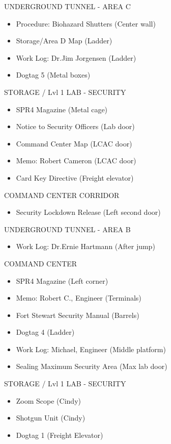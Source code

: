 \begin{subregion}{UNDERGROUND TUNNEL - AREA C}
    \begin{itemize}
        \item Procedure: Biohazard Shutters (Center wall)
        \item Storage/Area D Map (Ladder)
        \item Work Log: Dr.Jim Jorgensen (Ladder)
        \item Dogtag 5 (Metal boxes)
    \end{itemize}
\end{subregion}

\begin{subregion}{STORAGE / Lvl 1 LAB - SECURITY}
    \begin{itemize}
        \item SPR4 Magazine (Metal cage)
        \item Notice to Security Officers (Lab door)
        \item Command Center Map (LCAC door)
        \item Memo: Robert Cameron (LCAC door)
        \item Card Key Directive (Freight elevator)
    \end{itemize}
\end{subregion}


\begin{subregion}{COMMAND CENTER CORRIDOR}
    \begin{itemize}
        \item Security Lockdown Release (Left second door)
    \end{itemize}
\end{subregion}

\begin{subregion}{UNDERGROUND TUNNEL - AREA B}
    \begin{itemize}
        \item Work Log: Dr.Ernie Hartmann (After jump)
    \end{itemize}
\end{subregion}

\begin{subregion}{COMMAND CENTER}
    \begin{itemize}
        \item SPR4 Magazine (Left corner)
        \item Memo: Robert C., Engineer (Terminals)
        \item Fort Stewart Security Manual (Barrels)
        \item Dogtag 4 (Ladder)
        \item Work Log: Michael, Engineer (Middle platform)
        \item Sealing Maximum Security Area (Max lab door)
    \end{itemize}
\end{subregion}

\begin{subregion}{STORAGE / Lvl 1 LAB - SECURITY}
    \begin{itemize}
        \item Zoom Scope (Cindy)
        \item Shotgun Unit (Cindy)
        \item Dogtag 1 (Freight Elevator) 
    \end{itemize}
\end{subregion}
